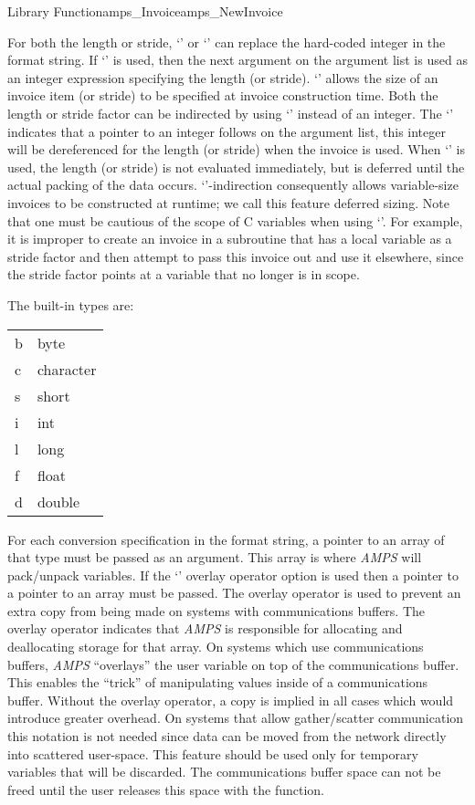 \begin{deftypefn}{Library Function}{amps_Invoice}{amps\_NewInvoice}
{For both the length or stride, `\code{*}' or `\code{&}' can replace
the hard-coded integer in the format string.  If `\code{*}' is used,
then the next argument on the argument list is used as an integer
expression specifying the length (or stride).  `\code{*}' allows the
size of an invoice item (or stride) to be specified at invoice
construction time.  Both the length or stride factor can be indirected
by using `\code{&}' instead of an integer.  The `\code{&}' indicates
that a pointer to an integer follows on the argument list, this
integer will be dereferenced for the length (or stride) when the
invoice is used.  When `\code{&}' is used, the length (or stride) is
not evaluated immediately, but is deferred until the actual packing of
the data occurs.  `\code{&}'-indirection consequently allows
variable-size invoices to be constructed at runtime; we call this
feature deferred sizing.  Note that one must be cautious of the scope
of C variables when using `\code{&}'.  For example, it is improper to
create an invoice in a subroutine that has a local variable as a
stride factor and then attempt to pass this invoice out and use it
elsewhere, since the stride factor points at a variable that no longer
is in scope.

The built-in types are:

\begin{tabular}{ll}
b & byte \\
c & character \\
s & short \\
i & int \\
l & long \\
f & float \\
d & double
\end{tabular}

For each conversion specification in the format string, a pointer to an
array of that type must be passed as an argument.  This array is where
{\em AMPS} will pack/unpack variables.  If the `' overlay
operator option is used then a pointer to a pointer to an array must be
passed.  The overlay operator is used to prevent an extra copy from
being made on systems with communications buffers.  The overlay operator
indicates that {\em AMPS} is responsible for allocating and
deallocating storage for that array.  On systems which use
communications buffers, {\em AMPS} ``overlays'' the user variable on
top of the communications buffer.  This enables the ``trick'' of
manipulating values inside of a communications buffer.  Without the
overlay operator, a copy is implied in all cases which would introduce
greater overhead.  On systems that allow gather/scatter communication
this notation is not needed since data can be moved from the network
directly into scattered user-space.  This feature should be used only
for temporary variables that will be discarded.  The communications
buffer space can not be freed until the user releases this space with
the  function.

}
\end{deftypefn}
